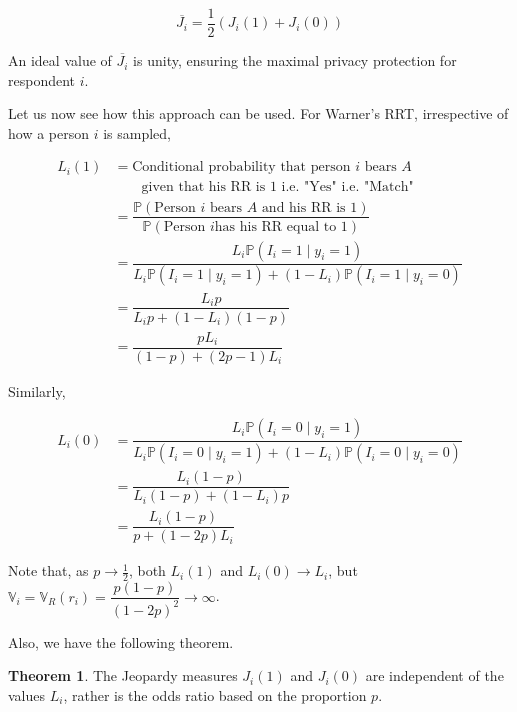 \documentclass[12pt]{article}
\newcommand{\prob}{\mathbb{P}}
\newcommand{\Var}{\mathbb{V}}
\theoremstyle{definition}
\newtheorem{thm}{Theorem}
\newenvironment{theorem}{
\begin{tcolorbox}[colback=green!5!white,colframe=green!75!black, parbox = false]\begin{thm} }{\end{thm}\end{tcolorbox} }
\begin{document}
$$\overline{J_i} = \dfrac{1}{2} \left( J_i(1) + J_i(0) \right)$$

An ideal value of $\overline{J_i}$ is unity, ensuring the maximal privacy protection for respondent $i$.

Let us now see how this approach can be used. For Warner's RRT, irrespective of how a person $i$ is sampled,

\begin{align*}
    L_i(1) 
    & = \text{Conditional probability that person } i \text{ bears } A\\
    & \qquad \text{given that his RR is 1 i.e. "Yes" i.e. "Match"}\\
    & = \dfrac{\prob(\text{Person } i \text{ bears } A \text{ and his RR is 1})}{\prob(\text{Person } i \text{has his RR equal to 1})}\\
    & = \dfrac{L_i \prob(I_i = 1 \mid y_i = 1)}{L_i \prob(I_i = 1 \mid y_i = 1) + (1 - L_i) \prob(I_i = 1 \mid y_i = 0) }\\
    & = \dfrac{L_i p}{L_i p + (1-L_i) (1 - p)}\\
    & = \dfrac{pL_i}{(1 - p) + (2p - 1)L_i}
\end{align*}

Similarly, 

\begin{align*}
    L_i(0)
    & = \dfrac{L_i \prob(I_i = 0 \mid y_i = 1)}{L_i \prob(I_i = 0 \mid y_i = 1) + (1 - L_i) \prob(I_i = 0 \mid y_i = 0)}\\
    & = \dfrac{L_i (1-p)}{L_i (1-p) + (1-L_i) p}\\
    & = \dfrac{L_i(1-p)}{p + (1-2p)L_i}
\end{align*}

Note that, as $p \rightarrow \frac{1}{2}$, both $L_i(1)$ and $L_i(0) \rightarrow L_i$, but $\Var_i = \Var_R(r_i) = \dfrac{p(1-p)}{(1-2p)^2} \rightarrow \infty$.

Also, we have the following theorem.

\begin{theorem}
    The Jeopardy measures $J_i(1)$ and $J_i(0)$ are independent of the values $L_i$, rather is the odds ratio based on the proportion $p$.
\end{theorem}
\end{document}
